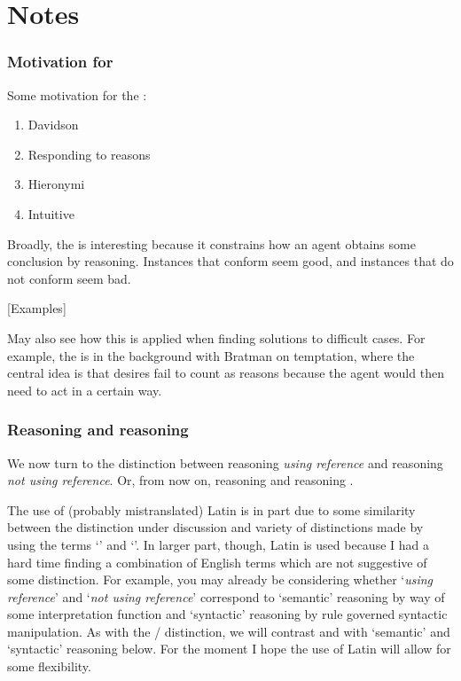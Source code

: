\chapter{Notes}
\label{cha:notes}

\subsection{Motivation for \ESU{}}
\label{sec:motiv-main-prem}

Some motivation for the \ESU{}:

\begin{enumerate}
\item Davidson
\item Responding to reasons
\item Hieronymi
\item Intuitive
\end{enumerate}

Broadly, the \ESU{} is interesting because it constrains how an agent obtains some conclusion by reasoning.
Instances that conform seem good, and instances that do not conform seem bad.

[Examples]

May also see how this is applied when finding solutions to difficult cases.
For example, the \ESU{} is in the background with Bratman on temptation, where the central idea is that desires fail to count as reasons because the agent would then need to act in a certain way.


\subsection{Reasoning \nr{} and reasoning \ur{}}
\label{sec:reas-dd-reas}

\begin{note}
  We now turn to the distinction between reasoning \emph{using reference} and reasoning \emph{not using reference}.
  Or, from now on, reasoning \ur{} and reasoning \nr{}.

  The use of (probably mistranslated) Latin is in part due to some similarity between the distinction under discussion and variety of distinctions made by using the terms `\dd{}' and `\dr{}'.
  In larger part, though, Latin is used because I had a hard time finding a combination of English terms which are not suggestive of some distinction.
  For example, you may already be considering whether `\emph{using reference}' and `\emph{not using reference}' correspond to `semantic' reasoning by way of some interpretation function and `syntactic' reasoning by rule governed syntactic manipulation.
  As with the \dd{}/\dr{} distinction, we will contrast \ur{} and \nr{} with `semantic' and `syntactic' reasoning below.
  For the moment I hope the use of Latin will allow for some flexibility.
\end{note}

